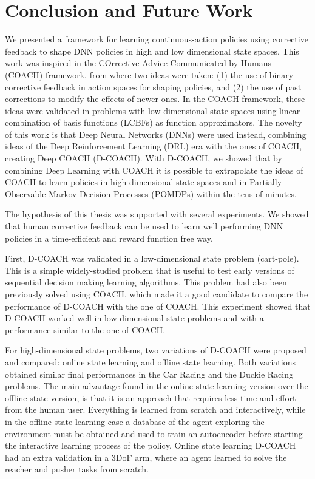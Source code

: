\chapter{Conclusion and Future Work}
We presented a framework for learning continuous-action policies using corrective feedback to shape DNN policies in high and low dimensional state spaces. This work was inspired in the COrrective Advice Communicated by Humans (COACH) framework, from where two ideas were taken: (1) the use of binary corrective feedback in action spaces for shaping policies, and (2) the use of past corrections to modify the effects of newer ones. In the COACH framework, these ideas were validated in problems with low-dimensional state spaces using linear combination of basis functions (LCBFs) as function approximators. The novelty of this work is that Deep Neural Networks (DNNs) were used instead, combining ideas of the Deep Reinforcement Learning (DRL) era with the ones of COACH, creating Deep COACH (D-COACH). With D-COACH, we showed that by combining Deep Learning with COACH it is possible to extrapolate the ideas of COACH to learn policies in high-dimensional state spaces and in Partially Observable Markov Decision Processes (POMDPs) within the tens of minutes. 

The hypothesis of this thesis was supported with several experiments. We showed that human corrective feedback can be used to learn well performing DNN policies in a time-efficient and reward function free way.

First, D-COACH was validated in a low-dimensional state problem (cart-pole). This is a simple widely-studied problem that is useful to test early versions of sequential decision making learning algorithms. This problem had also been previously solved using COACH, which made it a good candidate to compare the performance of D-COACH with the one of COACH. This experiment showed that D-COACH worked well in low-dimensional state problems and with a performance similar to the one of COACH. 

For high-dimensional state problems, two variations of D-COACH were proposed and compared: online state learning and offline state learning. Both variations obtained similar final performances in the Car Racing and the Duckie Racing problems. The main advantage found in the online state learning version over the offline state version, is that it is an approach that requires less time and effort from the human user. Everything is learned from scratch and interactively, while in the offline state learning case a database of the agent exploring the environment must be obtained and used to train an autoencoder before starting the interactive learning process of the policy. Online state learning D-COACH had an extra validation in a 3DoF arm, where an agent learned to solve the reacher and pusher tasks from scratch.

